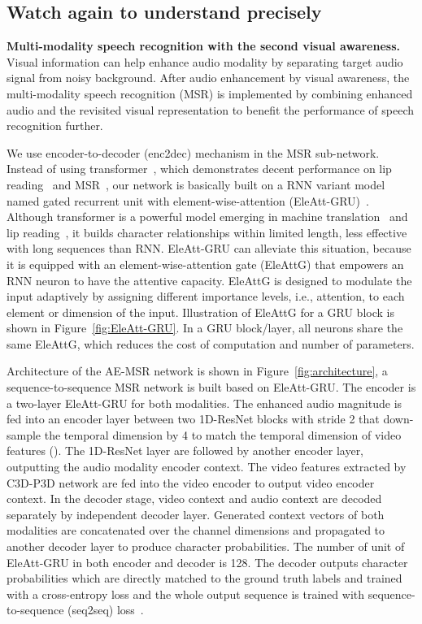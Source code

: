 \documentclass[10pt,twocolumn,letterpaper]{article}
\begin{document}
\subsection{Watch again to understand precisely} \label{Multi-modality speech recognition}
{\bf Multi-modality speech recognition with the second visual awareness.} Visual information can help enhance audio modality by separating target audio signal from noisy background. After audio enhancement by visual awareness, the multi-modality speech recognition (MSR) is implemented by combining enhanced audio and the revisited visual representation to benefit the performance of speech recognition further.

We use encoder-to-decoder (enc2dec) mechanism in the MSR sub-network. Instead of using transformer~\cite{vaswani2017attention}, which demonstrates decent performance on lip reading~\cite{afouras2018deep} and MSR~\cite{Triantafyllos-avsr2018}, our network is basically built on a RNN variant model named gated recurrent unit with element-wise-attention (EleAtt-GRU)~\cite{zhang2019eleatt}. Although transformer is a powerful model emerging in machine translation~\cite{vaswani2017attention} and lip reading~\cite{Triantafyllos-avsr2018,afouras2018deep}, it builds character relationships within limited length, less effective with long sequences than RNN. EleAtt-GRU can alleviate this situation, because it is equipped with an element-wise-attention gate (EleAttG) that empowers an RNN neuron to have the attentive capacity. EleAttG is designed to modulate the input adaptively by assigning different importance levels, i.e., attention, to each element or dimension of the input. Illustration of EleAttG for a GRU block is shown in Figure~\ref{fig:EleAtt-GRU}. In a GRU block/layer, all neurons share the same EleAttG, which reduces the cost of computation and number of parameters.    

Architecture of the AE-MSR network is shown in Figure~\ref{fig:architecture}, a sequence-to-sequence MSR network is built based on EleAtt-GRU. The encoder is a two-layer EleAtt-GRU for both modalities. The enhanced audio magnitude is fed into an encoder layer between two 1D-ResNet blocks with stride 2 that down-sample the temporal dimension by 4 to match the temporal dimension of video features (). The 1D-ResNet layer are followed by another encoder layer, outputting the audio modality encoder context. The video features extracted by C3D-P3D network are fed into the video encoder to output video encoder context. In the decoder stage, video context and audio context are decoded separately by independent decoder layer. Generated context vectors of both modalities are concatenated over the channel dimensions and propagated to another decoder layer to produce character probabilities. The number of unit of EleAtt-GRU in both encoder and decoder is 128. The decoder outputs character probabilities which are directly matched to the ground truth labels and trained with a cross-entropy loss and the whole output sequence is trained with sequence-to-sequence (seq2seq) loss~\cite{sutskever2014sequence}.
\end{document}

